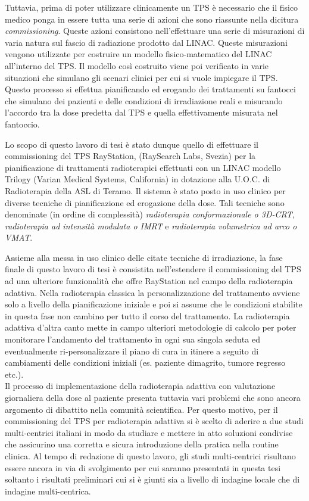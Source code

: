 Tuttavia, prima di poter utilizzare clinicamente un TPS è necessario che il fisico medico ponga in essere tutta una serie di azioni che sono riassunte nella dicitura \textit{commissioning}. Queste azioni consistono nell'effettuare una serie di misurazioni di varia natura sul fascio di radiazione prodotto dal LINAC. Queste misurazioni vengono utilizzate per costruire un modello fisico-matematico del LINAC all'interno del TPS. Il modello così costruito viene poi verificato in varie situazioni che simulano gli scenari clinici per cui si vuole impiegare il TPS. Questo processo si effettua pianificando ed erogando dei trattamenti su fantocci che simulano dei pazienti e delle condizioni di irradiazione reali e misurando l'accordo tra la dose predetta dal TPS e quella effettivamente misurata nel fantoccio.

Lo scopo di questo lavoro di tesi è stato dunque quello di effettuare il commissioning del TPS RayStation, (RaySearch Labs, Svezia) per la pianificazione di trattamenti radioterapici effettuati con un LINAC modello Trilogy (Varian Medical Systems, California) in dotazione alla U.O.C. di Radioterapia della ASL di Teramo. Il sistema è stato posto in uso clinico per diverse tecniche di pianificazione ed erogazione della dose. Tali tecniche sono denominate (in ordine di complessità) \textit{radioterapia conformazionale o 3D-CRT}, \textit{radioterapia ad intensità modulata o IMRT} e \textit{radioterapia volumetrica ad arco o VMAT}.

Assieme alla messa in uso clinico delle citate tecniche di irradiazione, la fase finale di questo lavoro di tesi è consistita nell'estendere il commissioning del TPS ad una ulteriore funzionalità che offre RayStation nel campo della radioterapia adattiva. Nella radioterapia classica la personalizzazione del trattamento avviene solo a livello della pianificazione iniziale e poi si assume che le condizioni stabilite in questa fase non cambino per tutto il corso del trattamento. La radioterapia adattiva d'altra canto mette in campo ulteriori metodologie di calcolo per poter monitorare l'andamento del trattamento in ogni sua singola seduta ed eventualmente ri-personalizzare il piano di cura in itinere a seguito di cambiamenti delle condizioni iniziali (es. paziente dimagrito, tumore regresso etc.).\\
Il processo di implementazione della radioterapia adattiva con valutazione giornaliera della dose al paziente presenta tuttavia vari problemi che sono ancora argomento di dibattito nella comunità scientifica. Per questo motivo, per il commissioning del TPS per radioterapia adattiva si è scelto di aderire a due studi multi-centrici italiani in modo da studiare e mettere in atto soluzioni condivise che assicurino una corretta e sicura introduzione della pratica nella routine clinica. Al tempo di redazione di questo lavoro, gli studi multi-centrici risultano essere ancora in via di svolgimento per cui saranno presentati in questa tesi soltanto i risultati preliminari cui si è giunti sia a livello di indagine locale che di indagine multi-centrica.






